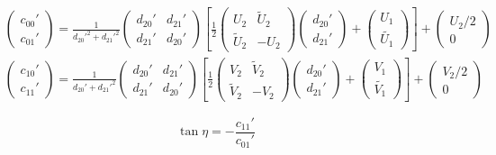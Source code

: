 \begin{equation}\label{eq:c_coeff}
\begin{split}
&
\begin{pmatrix}
c_{00}' \\
c_{01}' 
\end{pmatrix} = \frac{1}{d_{20}'^2 + d_{21}'^2}
\begin{pmatrix}
d_{20}' & d_{21}' \\
d_{21}' & d_{20}'
\end{pmatrix}
\left[ \frac{1}{2}
\begin{pmatrix}
U_2 & \tilde{U}_2 \\
\tilde{U}_2 & -U_2
\end{pmatrix}
\begin{pmatrix}
d_{20}' \\ d_{21}'
\end{pmatrix}
+ \begin{pmatrix}
U_1 \\ \tilde{U_1}
\end{pmatrix}
\right]
+ \begin{pmatrix}
U_2/2 \\ 0
\end{pmatrix} \\
&
\begin{pmatrix}
c_{10}' \\ c_{11}'
\end{pmatrix} 
= \frac{1}{d_{20}' + d_{21}'^2}
\begin{pmatrix}
d_{20}' & d_{21}' \\
d_{21}' & d_{20}'
\end{pmatrix}
\left[ \frac{1}{2}
\begin{pmatrix}
V_2 & \tilde{V}_2 \\
\tilde{V}_2 & -V_2
\end{pmatrix}
\begin{pmatrix}
d_{20}' \\ d_{21}'
\end{pmatrix}
+ \begin{pmatrix}
V_1 \\ \tilde{V_1}
\end{pmatrix}
\right]
+ \begin{pmatrix}
V_2/2 \\ 0
\end{pmatrix}
\end{split}
\end{equation}

\begin{equation}
\label{eq:eta}
\tan \eta = - \frac{c_{11}'}{c_{01}'}
\end{equation}

